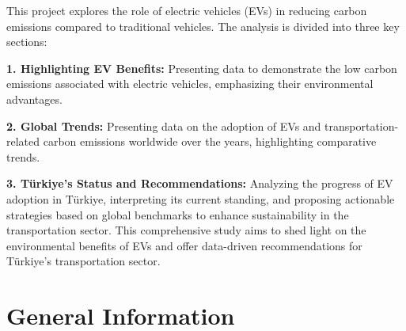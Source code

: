 \documentclass[
  11pt,
  a4paper,
  DIV=11,
  numbers=noendperiod]{scrartcl}
\begin{document}
This project explores the role of electric vehicles (EVs) in reducing
carbon emissions compared to traditional vehicles. The analysis is
divided into three key sections:

\textbf{1. Highlighting EV Benefits:} Presenting data to demonstrate the
low carbon emissions associated with electric vehicles, emphasizing
their environmental advantages.

\textbf{2. Global Trends:} Presenting data on the adoption of EVs and
transportation-related carbon emissions worldwide over the years,
highlighting comparative trends.

\textbf{3. Türkiye's Status and Recommendations:} Analyzing the progress
of EV adoption in Türkiye, interpreting its current standing, and
proposing actionable strategies based on global benchmarks to enhance
sustainability in the transportation sector. This comprehensive study
aims to shed light on the environmental benefits of EVs and offer
data-driven recommendations for Türkiye's transportation sector.

\section{General Information}\label{general-information}
\end{document}

